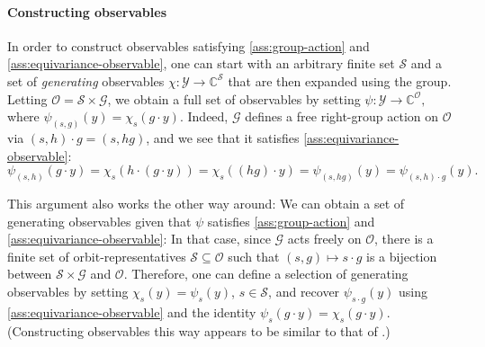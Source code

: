 \documentclass[preprint,12pt,authoryear]{elsarticle}
\newcommand{\C}{\mathbb{C}}
\newcommand\Gc{\mathcal G}
\newcommand\Oc{\mathcal O}
\newcommand\Yc{\mathcal Y}
\newcommand\Sc{\mathcal S}
\begin{document}
{\paragraph{Constructing observables}
In order to construct observables satisfying \ref{ass:group-action} and \ref{ass:equivariance-observable}, one can start with an arbitrary finite set $\Sc$ and a set of \emph{generating} observables $\chi :  \Yc \rightarrow \C^\Sc$ that are then expanded using the group. Letting $\Oc = \Sc \times \Gc$, we obtain a full set of observables by setting $\psi : \Yc \rightarrow \C^\Oc ,$ where $\psi_{(s,g)}( y ) = \chi_s( g \cdot y  )$. Indeed, $\Gc$ defines a free right-group action on $\Oc$ via $(s, h) \cdot g = (s, h g)$, and we see that it satisfies \ref{ass:equivariance-observable}:
$$
    \psi_{(s,h)}(g \cdot y) 
    = \chi_s( h \cdot (g \cdot y) ) 
    = \chi_s( (h g) \cdot y ) 
    = \psi_{(s, h g)}(y)
    = \psi_{(s, h) \cdot g}(y).
$$

This argument also works the other way around: We can obtain a set of generating observables given that $\psi$ satisfies \ref{ass:group-action} and \ref{ass:equivariance-observable}: In that case, since $\Gc$ acts freely on $\Oc$, there is a finite set of orbit-representatives $\Sc \subseteq \Oc$ such that $(s,g) \mapsto s \cdot g$ is a bijection between $\Sc \times \Gc$ and $\Oc$. Therefore, one can define a selection of generating observables by setting $\chi_s(y) = \psi_s(y)$, $s \in \Sc$, and recover $\psi_{s \cdot g}(y)$ using \ref{ass:equivariance-observable} and the identity $\psi_{s}(g \cdot y) = \chi_s(g \cdot y)$. (Constructing observables this way appears to be similar to that of \cite{salovaKoopmanOperatorIts2019}.)

}
\end{document}
